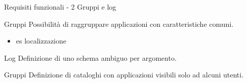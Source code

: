 \begin{tframe}{Requisiti funzionali - 2 \newline \mbox{} \hfill Gruppi e log}
\begin{minipage}{0.45\textwidth}
\begin{block}{Gruppi}
Possibilità di raggruppare applicazioni con caratteristiche comuni.
\begin{itemize} 
\item es localizzazione
\end{itemize}
\end{block}
\end{minipage}
\hfill
\begin{minipage}{0.45\textwidth}
\begin{block}{Log}
Definizione di uno schema ambiguo per argomento.
\end{block}
\begin{block}{Gruppi}
Definizione di cataloghi con applicazioni visibili solo ad alcuni utenti.
\end{block}
\end{minipage}
\end{tframe}
